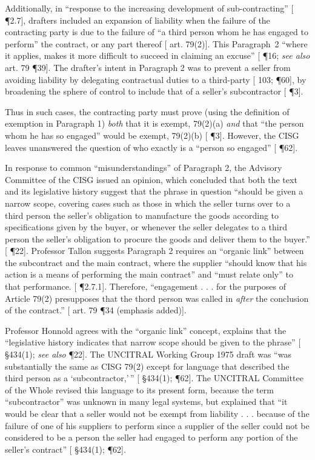 Additionally, in ``response to the increasing development of sub-contracting'' [\cite{Tallon} \P2.7], drafters included an expansion of liability when the failure of the contracting party is due to the failure of ``a third person whom he has engaged to perform'' the contract, or any part thereof [\cite{CISG} art. 79(2)].  This Paragraph~2 ``where it applies, makes it more difficult to succeed in claiming an excuse'' [\cite{CISG-AC Op. No. 7} \P16; \textit{see also} \cite{Schwenzer} art. 79 \P39]. The drafter's intent in Paragraph 2 was to prevent a seller from avoiding liability by delegating contractual duties to a third-party [\cite{Schlechtriem} 103; \cite{Atamer} \P60], by broadening the sphere of control to include that of a seller's subcontractor [\cite{Atamer} \P3]. 

Thus in such cases, the contracting party must prove (using the definition of exemption in Paragraph 1) \textit{both} that it is exempt, 79(2)(a) \textit{and} that ``the person whom he has so engaged'' would be exempt, 79(2)(b) [\cite{Atamer} \P3].  However, the CISG leaves unanswered the question of who exactly is a ``person so engaged'' [\cite{Atamer} \P62]. 

In response to common ``misunderstandings'' of Paragraph 2, the Advisory Committee of the CISG issued an opinion, which concluded that both the text and its legislative history suggest that the phrase in question ``should be given a narrow scope, covering cases such as those in which the seller turns over to a third person the seller's obligation to manufacture the goods according to specifications given by the buyer, or whenever the seller delegates to a third person the seller's obligation to procure the goods and deliver them to the buyer.'' [\cite{CISG-AC Op. No. 7} \P22].  Professor Tallon suggests Paragraph 2 requires an ``organic link'' between the subcontract and the main contract, where the supplier ``should know that his action is a means of performing the main contract'' and ``must relate only'' to that performance. [\cite{Tallon} \P2.7.1]. Therefore, ``engagement . . . for the purposes of Article 79(2) presupposes that the thord person was called in \textit{after} the conclusion of the contract.'' [\cite{Schwenzer} art. 79 \P34 (emphasis added)].

Professor Honnold agrees with the ``organic link'' concept, explains that the ``legislative history indicates that narrow scope should be given to the phrase'' [\cite{Honnold} \S434(1); \textit{see also} \cite{CISG-AC Op. No. 7} \P22]. The UNCITRAL Working Group 1975 draft was  ``was substantially the same as CISG 79(2) except for language that described the third person as a `subcontractor,'\,'' [\cite{Honnold} \S434(1); \cite{Atamer} \P62]. The UNCITRAL Committee of the Whole revised this language to its present form, because the term ``subcontractor'' was unknown in many legal systems, but explained that ``it would be clear that a seller would not be exempt from liability . . . because of the failure of one of his suppliers to perform since a supplier of the seller could not be considered to be a person the seller had engaged to perform any portion of the seller's contract'' [\cite{Honnold} \S434(1); \cite{Atamer} \P62].

